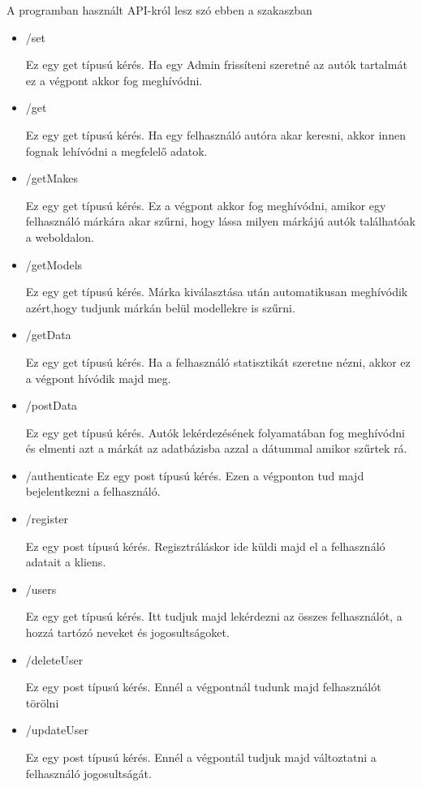  
A programban használt API-król lesz szó ebben a szakaszban
\begin{itemize}
\item /set

Ez egy get típusú kérés. Ha egy Admin frissíteni szeretné az autók tartalmát ez a végpont akkor fog meghívódni.
\item /get

Ez egy get típusú kérés. Ha egy felhasználó autóra akar keresni, akkor innen fognak lehívódni a megfelelő adatok.
\item /getMakes

Ez egy get típusú kérés. Ez a végpont akkor fog meghívódni, amikor egy felhasználó márkára akar szűrni, hogy lássa milyen márkájú autók találhatóak a weboldalon.
\item /getModels

Ez egy get típusú kérés. Márka kiválasztása után automatikusan meghívódik azért,hogy tudjunk márkán belül modellekre is szűrni.

\item /getData

Ez egy get típusú kérés. Ha a felhasználó statisztikát szeretne nézni, akkor ez a végpont hívódik majd meg.
\item /postData

Ez egy get típusú kérés. Autók lekérdezésének folyamatában fog meghívódni és elmenti azt a márkát az adatbázisba azzal a dátummal amikor szűrtek rá.
\item /authenticate
Ez egy post típusú kérés. Ezen a végponton tud majd bejelentkezni a felhasználó.

\item /register

Ez egy post típusú kérés. Regisztráláskor ide küldi majd el a felhasználó adatait a kliens.
\item /users

Ez egy get típusú kérés. Itt tudjuk majd lekérdezni az összes felhasználót, a hozzá tartózó neveket és jogosultságoket.
\item /deleteUser

Ez egy post típusú kérés. Ennél a végpontnál tudunk majd felhasználót törölni
\item /updateUser

Ez egy post típusú kérés. Ennél  a végpontál tudjuk majd változtatni a felhasználó jogosultságát.

\end{itemize}









